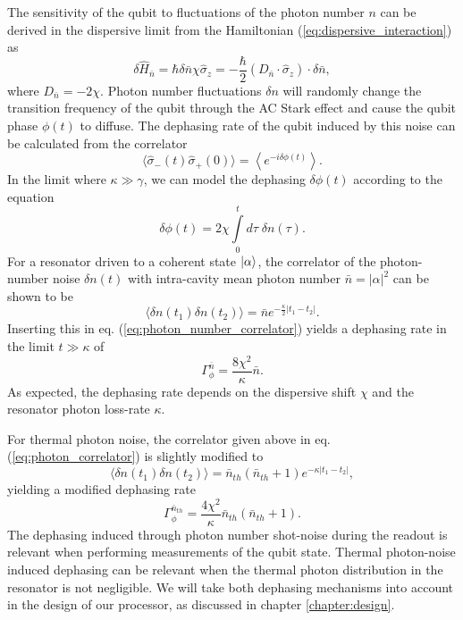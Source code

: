 \smallskip

The sensitivity of the qubit to fluctuations of the photon number $n$ can be derived in the dispersive limit from the Hamiltonian (\ref{eq:dispersive_interaction}) as
%
\begin{equation}
\delta \hat{H}_{\bar{n}}=\hbar\delta\bar{n}\chi\hat{\sigma}_z = -\frac{\hbar}{2}\left(D_{\bar{n}}\cdot\hat{\sigma}_z\right)\cdot \delta \bar{n},
\end{equation}
%
where $D_{\bar{n}}=-2\chi$. Photon number fluctuations $\delta n$ will randomly change the transition frequency of the qubit through the AC Stark effect and cause the qubit phase $\phi(t)$ to diffuse. The dephasing rate of the qubit induced by this noise can be calculated from the correlator
%
\begin{equation}
\langle \hat{\sigma}_-(t)\hat{\sigma}_+(0)\rangle = \left\langle e^{-i\delta \phi(t)}\right\rangle. \label{eq:photon_number_correlator}
\end{equation}
%
In the limit where $\kappa\gg \gamma$, we can model the dephasing $\delta \phi(t)$ according to the equation
%
\begin{equation}
\delta \phi(t) = 2\chi\int\limits_0^t d\tau \; \delta n(\tau).
\end{equation}
%
For a resonator driven to a coherent state $\left| \alpha \right>$, the correlator of the photon-number noise $\delta n(t)$ with intra-cavity mean photon number $\bar{n}=|\alpha|^2$ can be shown to be 
%
\begin{equation}
\langle \delta n (t_1)\delta n (t_2) \rangle = \bar{n}e^{-\frac{\kappa}{2}|t_1-t_2|}. \label{eq:photon_correlator}
\end{equation}
%
Inserting this in eq. (\ref{eq:photon_number_correlator}) yields a dephasing rate in the limit $t \gg \kappa$ of
%
\begin{equation}
\Gamma_\phi^{\bar{n}} = \frac{8\chi^2}{\kappa}\bar{n}. \label{eq:photon_number_dephasing_rate}
\end{equation}
%
As expected, the dephasing rate depends on the dispersive shift $\chi$ and the resonator photon loss-rate $\kappa$. 

\smallskip

For thermal photon noise, the correlator given above in eq. (\ref{eq:photon_correlator}) is slightly modified to
%
\begin{equation}
\langle \delta n(t_1)\delta n (t_2)\rangle = \bar{n}_{th}(\bar{n}_{th}+1)e^{-\kappa|t_1-t_2|},
\end{equation}
%
yielding a modified dephasing rate
%
\begin{equation}
\Gamma_\phi^{\bar{n}_{th}} = \frac{4\chi^2}{\kappa}\bar{n}_{th}(\bar{n}_{th}+1). \label{eq:thermal_photon_number_dephasing_rate}
\end{equation}
%
The dephasing induced through photon number shot-noise during the readout is relevant when performing measurements of the qubit state. Thermal photon-noise induced dephasing can be relevant when the thermal photon distribution in the resonator is not negligible. We will take both dephasing mechanisms into account in the design of our processor, as discussed in chapter \ref{chapter:design}.


